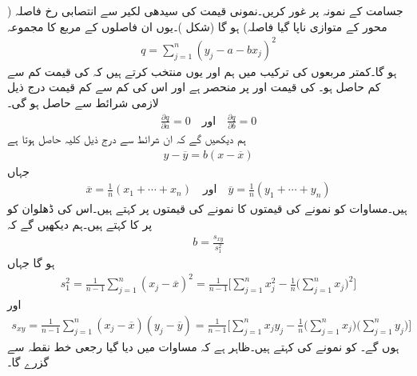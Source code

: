 جسامت  کے نمونہ  پر غور کریں۔نمونی قیمت  کی سیدھی لکیر  سے انتصابی رخ فاصلہ ( محور کے متوازی ناپا گیا فاصلہ)  ہو گا (شکل )۔یوں ان فاصلوں کے مربع کا مجموعہ
\begin{align}\label{مساوات_شماریات_سیدھا_خط_بٹھانا_الف}
q=\sum_{j=1}^{n}(y_j-a-bx_j)^2
\end{align}
ہو گا۔کمتر مربعوں کی ترکیب میں ہم  اور  یوں منتخب کرتے ہیں کہ  کی قیمت کم سے کم حاصل ہو۔ کی قیمت  اور  پر منحصر ہے اور اس کی کم سے کم قیمت درج ذیل لازمی شرائط سے حاصل ہو گی۔
\begin{align}\label{مساوات_شماریات_سیدھا_خط_بٹھانا_ب}
\frac{\partial q}{\partial a}=0 \quad \text{اور}\quad \frac{\partial q}{\partial b}=0
\end{align}
ہم دیکھیں گے کہ ان شرائط سے درج ذیل کلیہ حاصل ہوتا ہے
\begin{align}\label{مساوات_شماریات_سیدھا_خط_بٹھانا_پ}
y-\overline{y}=b(x-\overline{x})
\end{align}
جہاں
\begin{align}\label{مساوات_شماریات_سیدھا_خط_بٹھانا_ت}
\overline{x}=\frac{1}{n}(x_1+\cdots+x_n)\quad \text{اور}\quad \overline{y}=\frac{1}{n}(y_1+\cdots+y_n)
\end{align}
ہیں۔مساوات  کو نمونے کی  قیمتوں کا نمونے کی  قیمتوں پر   کہتے ہیں۔اس کی ڈھلوان  کو  پر  کا  کہتے ہیں۔ہم دیکھیں گے کہ 
\begin{align}\label{مساوات_شماریات_سیدھا_خط_بٹھانا_ٹ}
b=\frac{s_{xy}}{s_1^2}
\end{align}
ہو گا جہاں 
\begin{align}\label{مساوات_شماریات_سیدھا_خط_بٹھانا_ث}
s_1^2=\frac{1}{n-1}\sum_{j=1}^{n}(x_j-\overline{x})^2=\frac{1}{n-1}\big[\sum_{j=1}^{n}x_j^2-\frac{1}{n}\big(\sum_{j=1}^{n}x_j\big)^2\big]
\end{align}
اور
\begin{align}\label{مساوات_شماریات_سیدھا_خط_بٹھانا_ج}
s_{xy}=\frac{1}{n-1}\sum_{j=1}^{n}(x_j-\overline{x})(y_j-\overline{y})=\frac{1}{n-1}\big[\sum_{j=1}^{n}x_jy_j-\frac{1}{n}\big(\sum_{j=1}^{n}x_j\big)\big(\sum_{j=1}^{n}y_j\big)\big]
\end{align}
ہوں گے۔ کو نمونے کی  کہتے ہیں۔ظاہر ہے کہ مساوات  میں دیا گیا رجعی خط نقطہ  سے گزرے گا۔ 


